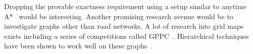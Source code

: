 \documentclass[a4paper,UKenglish,cleveref, autoref, thm-restate]{lipics-v2021}
\begin{document}
Dropping the provable exactness requirement using a setup similar to anytime A*~\cite{DBLP:conf/aaai/ZhouH02,DBLP:conf/nips/LikhachevGT03} would be interesting.
Another promising research avenue would be to investigate graphs other than road networks.
A lot of research into grid maps exists including a series of competitions called GPPC~\cite{DBLP:conf/socs/SturtevantTTUKS15}.
Hierarchical techniques have been shown to work well on these graphs~\cite{DBLP:conf/aaai/UrasK14}.




\end{document}

